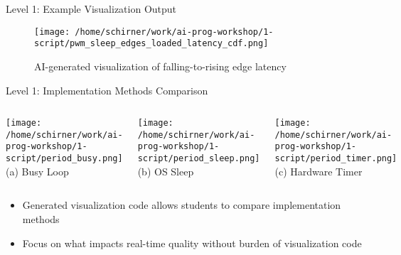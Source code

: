 \documentclass{beamer}
\begin{document}
\begin{frame}{Level 1: Example Visualization Output}
    \begin{figure}
        \centering
        \texttt{[image: /home/schirner/work/ai-prog-workshop/1-script/pwm\_sleep\_edges\_loaded\_latency\_cdf.png]}
        \caption{AI-generated visualization of falling-to-rising edge latency}
    \end{figure}
\end{frame}

\begin{frame}{Level 1: Implementation Methods Comparison}
    \begin{columns}
        \texttt{[image: /home/schirner/work/ai-prog-workshop/1-script/period\_busy.png]}
        \centering (a) Busy Loop
        
        \texttt{[image: /home/schirner/work/ai-prog-workshop/1-script/period\_sleep.png]}
        \centering (b) OS Sleep
        
        \texttt{[image: /home/schirner/work/ai-prog-workshop/1-script/period\_timer.png]}
        \centering (c) Hardware Timer
    \end{columns}
    
    \begin{itemize}
        \item Generated visualization code allows students to compare implementation methods
        \item Focus on what impacts real-time quality without burden of visualization code
    \end{itemize}
\end{frame}
\end{document}
